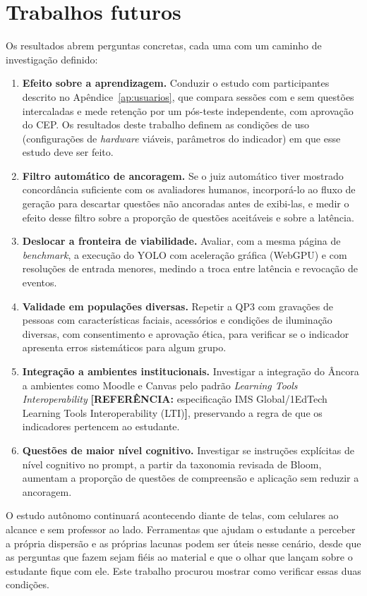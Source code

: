 \documentclass[portuguese,oneside]{tcc}
\newcommand{\ferramenta}{Âncora\xspace}
\newcommand{\estr}[1]{\emph{#1}}
\newcommand{\referencia}[1]{\textcolor{blue!60!black}{\textbf{[REFERÊNCIA:} #1\textbf{]}}}
\begin{document}
\section{Trabalhos futuros}

Os resultados abrem perguntas concretas, cada uma com um caminho de investigação definido:

\begin{enumerate}
  \item \textbf{Efeito sobre a aprendizagem.} Conduzir o estudo com participantes descrito no Apêndice~\ref{ap:usuarios}, que compara sessões com e sem questões intercaladas e mede retenção por um pós-teste independente, com aprovação do CEP. Os resultados deste trabalho definem as condições de uso (configurações de \estr{hardware} viáveis, parâmetros do indicador) em que esse estudo deve ser feito.
  \item \textbf{Filtro automático de ancoragem.} Se o juiz automático tiver mostrado concordância suficiente com os avaliadores humanos, incorporá-lo ao fluxo de geração para descartar questões não ancoradas antes de exibi-las, e medir o efeito desse filtro sobre a proporção de questões aceitáveis e sobre a latência.
  \item \textbf{Deslocar a fronteira de viabilidade.} Avaliar, com a mesma página de \estr{benchmark}, a execução do YOLO com aceleração gráfica (WebGPU) e com resoluções de entrada menores, medindo a troca entre latência e revocação de eventos.
  \item \textbf{Validade em populações diversas.} Repetir a QP3 com gravações de pessoas com características faciais, acessórios e condições de iluminação diversas, com consentimento e aprovação ética, para verificar se o indicador apresenta erros sistemáticos para algum grupo.
  \item \textbf{Integração a ambientes institucionais.} Investigar a integração do \ferramenta a ambientes como Moodle e Canvas pelo padrão \estr{Learning Tools Interoperability} \referencia{especificação IMS Global/1EdTech Learning Tools Interoperability (LTI)}, preservando a regra de que os indicadores pertencem ao estudante.
  \item \textbf{Questões de maior nível cognitivo.} Investigar se instruções explícitas de nível cognitivo no prompt, a partir da taxonomia revisada de Bloom, aumentam a proporção de questões de compreensão e aplicação sem reduzir a ancoragem.
\end{enumerate}

O estudo autônomo continuará acontecendo diante de telas, com celulares ao alcance e sem professor ao lado. Ferramentas que ajudam o estudante a perceber a própria dispersão e as próprias lacunas podem ser úteis nesse cenário, desde que as perguntas que fazem sejam fiéis ao material e que o olhar que lançam sobre o estudante fique com ele. Este trabalho procurou mostrar como verificar essas duas condições.
\end{document}
